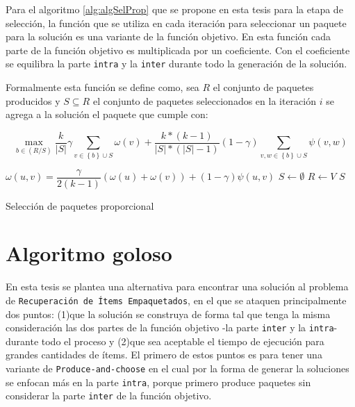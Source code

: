 Para el algoritmo \ref{alg:algSelProp} que se propone en esta tesis para la etapa de selección, la función que se utiliza en cada iteración para seleccionar un paquete para la solución es una variante de la función objetivo. En esta función cada parte de la función objetivo es multiplicada por un coeficiente. Con el coeficiente se equilibra la parte \texttt{intra} y la \texttt{inter} durante todo la generación de la solución.   

Formalmente esta función se define como, sea $R$ el conjunto de paquetes producidos y $S \subseteq R$ el conjunto de paquetes seleccionados en la iteración $i$ se agrega a la solución el paquete que cumple con:

\begin{equation}
\max_{b \in (R/S)}{\dfrac{k}{|S|}} \gamma \sum_{v \in \left\{b\right\} \cup S}{\omega(v)} + \dfrac{k * (k-1)}{|S| * (|S|-1)} (1-\gamma) \sum_{v,w \in \left\{b\right\} \cup S}{\psi(v,w)}
\end{equation}

\begin{center}
	\begin{algorithm}[H]
	\DontPrintSemicolon
	\SetAlgoLined
		$\omega(u,v) = \dfrac{\gamma}{2( k - 1)} (\omega(u) + \omega(v)) + (1 - \gamma)\psi(u,v)$\;
		$S \leftarrow \emptyset$\;
		$R \leftarrow V$\;
		\Return $S$\;
	\caption{Selección de paquetes proporcional}\label{alg:algSelProp}
	\end{algorithm}
\end{center}

\section{Algoritmo goloso}

En esta tesis se plantea una alternativa para encontrar una solución al problema de \texttt{Recuperación de Ítems Empaquetados}, en el que se ataquen principalmente dos puntos: (1)que la solución se construya de forma tal que tenga la misma consideración las dos partes de la función objetivo -la parte \texttt{inter} y la \texttt{intra}- durante todo el proceso y (2)que sea aceptable el tiempo de ejecución para grandes cantidades de ítems. El primero de estos puntos es para tener una variante de \texttt{Produce-and-choose} en el cual por la forma de generar la soluciones se enfocan más en la parte \texttt{intra}, porque primero produce paquetes sin considerar la parte \texttt{inter} de la función objetivo.

